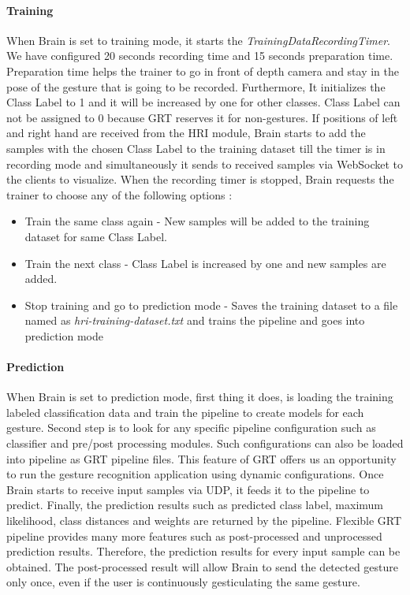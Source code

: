 \paragraph*{Training} When Brain is set to training mode, it starts the \textit{TrainingDataRecordingTimer}. We have configured 20 seconds recording time and 15 seconds preparation time. Preparation time helps the trainer to go in front of depth camera and stay in the pose of the gesture that is going to be recorded. Furthermore, It initializes the Class Label to 1 and it will be increased by one for other classes. Class Label can not be assigned to 0 because GRT reserves it for non-gestures. If positions of left and right hand are received from the HRI module, Brain starts to add the samples with the chosen Class Label to the training dataset till the timer is in recording mode and simultaneously it sends to received samples via WebSocket to the clients to visualize. When the recording timer is stopped, Brain requests the trainer to choose any of the following options : 
\begin{itemize}
	\item Train the same class again - New samples will be added to the training dataset for same Class Label. 
	\item Train the next class - Class Label is increased by one and new samples are added. 
	\item Stop training and go to prediction mode - Saves the training dataset to a file named as \textit{hri-training-dataset.txt} and trains the pipeline and goes into prediction mode 
\end{itemize}

\paragraph*{Prediction} When Brain is set to prediction mode, first thing it does, is loading the training labeled classification data and train the pipeline to create models for each gesture. Second step is to look for any specific pipeline configuration such as classifier and pre/post processing modules. Such configurations can also be loaded into pipeline as GRT pipeline files. This feature of GRT offers us an opportunity to run the gesture recognition application using dynamic configurations. Once Brain starts to receive input samples via UDP, it feeds it to the pipeline to predict. Finally, the prediction results such as predicted class label, maximum likelihood, class distances and weights are returned by the pipeline. Flexible GRT pipeline provides many more features such as post-processed and unprocessed prediction results. Therefore, the prediction results for every input sample can be obtained. The post-processed result will allow Brain to send the detected gesture only once, even if the user is continuously gesticulating the same gesture. 

